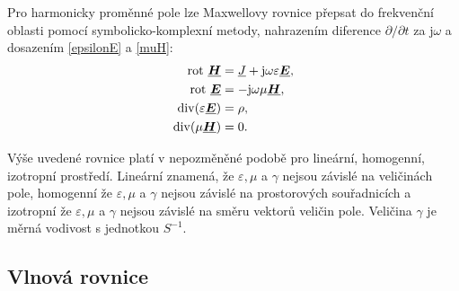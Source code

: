 \documentclass[12pt,a4paper,oneside]{article}
\numberwithin{equation}{section} %
\numberwithin{figure}{section} %
\numberwithin{table}{section} %
\newcommand{\mj}{\mathrm{j}} %
\renewcommand{\vec}[1]{\mbox{\boldmath$#1$}} %
\newcommand{\faz}[1]{{\underline{#1}}} %
\newcommand{\rot}{\mathrm{rot}\ }
\begin{document}
Pro harmonicky proměnné pole lze Maxwellovy rovnice přepsat do frekvenční oblasti pomocí symbolicko-komplexní metody, nahrazením diference $\partial / \partial t$ za $\mj \omega$ a dosazením \ref{epsilonE} a \ref{muH}:
\begin{subequations}
\begin{align}
\label{max1fharm}
\rot \faz{\vec{H}} &= \faz{J} + \mj \omega \varepsilon \faz{\vec{E}},
\\
\label{max2fharm}
\rot \faz{\vec{E}} &= - \mj \omega \mu \faz{\vec{H}},
\\
\udiv (\varepsilon \faz{\vec{E}}) &= \rho,
\\
\udiv (\mu \faz{\vec{H}}) &= 0.
\end{align}
\end{subequations}

Výše uvedené rovnice platí v nepozměněné podobě pro lineární, homogenní, izotropní prostředí. Lineární znamená, že $\varepsilon , \mu$ a $\gamma$ nejsou závislé na veličinách pole, homogenní že $\varepsilon , \mu$ a $\gamma$ nejsou závislé na prostorových souřadnicích a izotropní že $\varepsilon , \mu$ a $\gamma$ nejsou závislé na směru vektorů veličin pole. Veličina $\gamma$ je měrná vodivost s jednotkou $S ^{-1}$.


\subsection{Vlnová rovnice}
\end{document}
